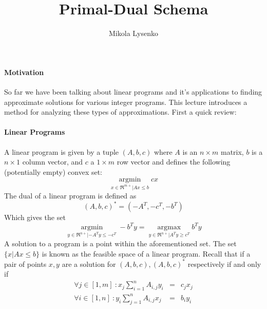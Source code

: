 \documentclass{article}
\title{Primal-Dual Schema}
\author{Mikola Lysenko}
\begin{document}
\maketitle{}

\paragraph{Motivation} So far we have been talking about linear programs and it's applications to finding approximate solutions for various integer programs.  This lecture introduces a method for analyzing these types of approximations.  First a quick review:

\paragraph{Linear Programs} A linear program is given by a tuple $(A, b, c)$ where $A$ is an $n \times m$ matrix, $b$ is a $n \times 1$ column vector, and $c$ a $1 \times m$ row vector and defines the following (potentially empty) convex set:
\[ \underset{x \in \Re^{m+} | A x \leq b} { \operatorname{argmin} } c x \]
The dual of a linear program is defined as
\[ (A, b, c)^* = (-A^T, -c^T, -b^T) \]
Which gives the set
\[ \underset{y \in \Re^{n+} | -A^T y \leq -c^T } { \operatorname{argmin} } -b^T y =  \underset{y \in \Re^{n+} | A^T y \geq c^T } { \operatorname{argmax} } b^T y \]
A solution to a program is a point within the aforementioned set.  The set $\{ x | A x \leq b \}$ is known as the feasible space of a linear program.  Recall that if a pair of points $x, y$  are a solution for $(A,b,c), (A,b,c)^*$ respectively if and only if
\begin{eqnarray}
\forall{ j \in [1, m] } \: : x_j \sum \limits_{i=1}^n A_{i,j} y_i & = &  c_j x_j \\
\forall{ i \in [1, n] } \: : y_i \sum \limits_{j=1}^n A_{i,j} x_j & = &  b_i y_i
\end{eqnarray}
\end{document}
